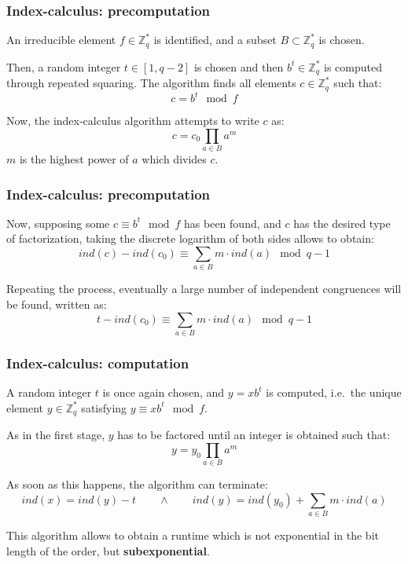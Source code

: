 \documentclass{beamer}
\begin{document}

\begin{frame}
\frametitle{Index-calculus: precomputation}

An irreducible element $f \in \mathbb{Z}^*_q$ is identified, and a subset $B \subset \mathbb{Z}^*_q$ is chosen.

Then, a random integer $t \in [1, q - 2]$ is chosen and then $b^t \in \mathbb{Z}^*_q$ is computed through repeated squaring. The algorithm finds all elements $c \in \mathbb{Z}^*_q$ such that:
$$c = b^t \mod f$$

Now, the index-calculus algorithm attempts to write $c$ as:
$$c = c_0 \prod_{a \in B} a ^{m}$$
$m$ is the highest power of $a$ which divides $c$.

\end{frame}


\begin{frame}
\frametitle{Index-calculus: precomputation}

Now, supposing some $c \equiv b^t \mod f$ has been found, and $c$ has the desired type of factorization, taking the discrete logarithm of both sides allows to obtain:
$$ind(c) - ind(c_0) \equiv \sum_{a \in B} m \cdot ind(a) \mod q - 1$$

Repeating the process, eventually a large number of independent congruences will be found, written as:
$$t - ind(c_0) \equiv \sum_{a \in B} m \cdot ind(a) \mod q - 1$$

\end{frame}


\begin{frame}
\frametitle{Index-calculus: computation}

A random integer $t$ is once again chosen, and $y = xb^t$ is computed, i.e.\ the unique element $y \in \mathbb{Z}^*_q$ satisfying $y \equiv xb^t \mod f$.

As in the first stage, $y$ has to be factored until an integer is obtained such that:
$$y = y_0 \prod_{a \in B} a ^{m}$$

As soon as this happens, the algorithm can terminate:
\[ind(x) = ind(y) - t \qquad \land \qquad ind(y) = ind(y_0) + \sum_{a \in B} m \cdot ind(a)\]

This algorithm allows to obtain a runtime which is not exponential in the bit length of the order, but \textbf{subexponential}.

\end{frame}
\end{document}
